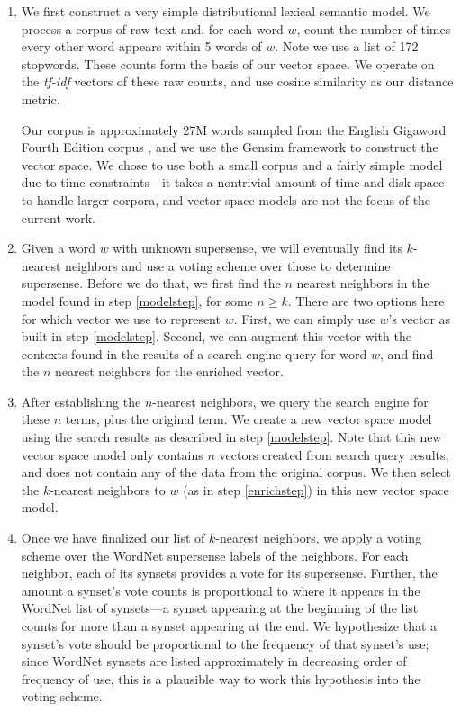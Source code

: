 \documentclass{article}
\begin{document}
\begin{enumerate}
\item\label{modelstep}
We first construct a very simple distributional lexical semantic model.
We process a corpus of raw text and, for each word $w$, count the number of times every other word appears within 5 words of $w$.
Note we use a list of 172 stopwords.
These counts form the basis of our vector space.
We operate on the {\it tf-idf} vectors of these raw counts, and use cosine similarity as our distance metric.

Our corpus is approximately 27M words sampled from the English Gigaword Fourth Edition corpus \cite{gigaword}, and we use the Gensim framework \cite{gensim} to construct the vector space.
We chose to use both a small corpus and a fairly simple model due to time constraints---it takes a nontrivial amount of time and disk space to handle larger corpora, and vector space models are not the focus of the current work.

\item \label{enrichstep}
Given a word $w$ with unknown supersense, we will eventually find its $k$-nearest neighbors and use a voting scheme over those to determine supersense.
Before we do that, we first find the $n$ nearest neighbors in the model found in step \ref{modelstep}, for some $n \geq k$.
There are two options here for which vector we use to represent $w$.
First, we can simply use $w$'s vector as built in step \ref{modelstep}.
Second, we can augment this vector with the contexts found in the results of a search engine query for word $w$, and find the $n$ nearest neighbors for the enriched vector.

\item \label{refinestep}
After establishing the $n$-nearest neighbors, we query the search engine for these $n$ terms, plus the original term. 
We create a new vector space model using the search results as described in step \ref{modelstep}. 
Note that this new vector space model only contains $n$ vectors created from search query results, and does not contain any of the data from the original corpus. 
We then select the $k$-nearest neighbors to $w$ (as  in step \ref{enrichstep}) in this new vector space model.

\item
\label{item:voting}
Once we have finalized our list of $k$-nearest neighbors, we apply a voting scheme over the WordNet supersense labels of the neighbors.
For each neighbor, each of its synsets provides a vote for its supersense.
Further, the amount a synset's vote counts is proportional to where it appears in the WordNet list of synsets---a synset appearing at the beginning of the list counts for more than a synset appearing at the end.
We hypothesize that a synset's vote should be proportional to the frequency of that synset's use; since WordNet synsets are listed approximately in decreasing order of frequency of use, this is a plausible way to work this hypothesis into the voting scheme.


\end{enumerate}
\end{document}

